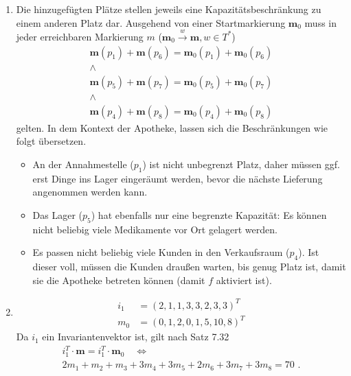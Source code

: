\documentclass[a4paper]{scrartcl}
\newcommand{\gdw}{\Leftrightarrow}
\begin{document}
\begin{enumerate}
    \item
        Die hinzugefügten Plätze stellen jeweils eine Kapazitätsbeschränkung zu
        einem anderen Platz dar.
        Ausgehend von einer Startmarkierung $\textbf{m}_0$ muss in jeder
        erreichbaren Markierung $m$
        ($\textbf{m}_0 \stackrel{w}{\to} \textbf{m}, w \in T^*$)
        \begin{equation}
            \begin{gathered}
                \textbf{m}(p_1) + \textbf{m}(p_6) = \textbf{m}_0(p_1) + \textbf{m}_0(p_6) \\
                \land \\
                \textbf{m}(p_5) + \textbf{m}(p_7) = \textbf{m}_0(p_5) + \textbf{m}_0(p_7) \\
                \land \\
                \textbf{m}(p_4) + \textbf{m}(p_8) = \textbf{m}_0(p_4) + \textbf{m}_0(p_8)
            \end{gathered}
        \end{equation}
        gelten.
        In dem Kontext der Apotheke, lassen sich die Beschränkungen wie folgt
        übersetzen.
        \begin{itemize}
            \item
                An der Annahmestelle ($p_1$) ist nicht unbegrenzt Platz, daher
                müssen ggf. erst Dinge ins Lager eingeräumt werden, bevor die
                nächste Lieferung angenommen werden kann.

            \item
                Das Lager ($p_5$) hat ebenfalls nur eine begrenzte Kapazität:
                Es können nicht beliebig viele Medikamente vor Ort gelagert
                werden.

            \item
                Es passen nicht beliebig viele Kunden in den Verkaufsraum
                ($p_4$).
                Ist dieser voll, müssen die Kunden draußen warten, bis genug
                Platz ist, damit sie die Apotheke betreten können (damit $f$
                aktiviert ist).

        \end{itemize}

    \item
        \begin{align}
            i_1 &= \left( 2, 1, 1, 3, 3, 2, 3, 3 \right)^T \\
            m_0 &= \left( 0, 1, 2, 0, 1, 5, 10, 8 \right)^T
        \end{align}
        Da $i_1$ ein Invariantenvektor ist, gilt nach Satz 7.32
        \begin{equation}
            \begin{gathered}
                i_1^T \cdot \textbf{m} = i_1^T \cdot \textbf{m}_0 \quad \gdw \\
                2m_1 + m_2 + m_3 + 3m_4 + 3m_5 + 2m_6 + 3m_7 + 3m_8 = 70
                \text{ .}
            \end{gathered}
        \end{equation}
        


\end{enumerate}
\end{document}
